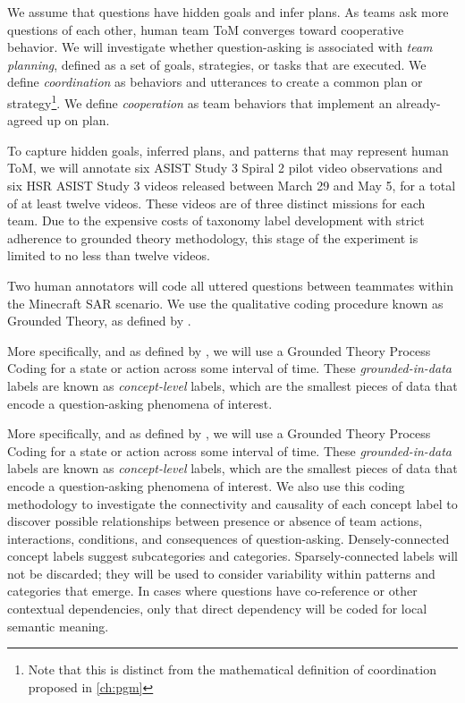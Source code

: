 We assume that questions have hidden goals and infer plans. As teams ask more
questions of each other, human team ToM converges toward cooperative behavior.
We will investigate whether question-asking is associated with \emph{team
planning}, defined as a set of goals, strategies, or tasks that are executed.
We define \emph{coordination} as behaviors and utterances to create a common
plan or strategy\footnote{Note that this is distinct from the mathematical
definition of coordination proposed in \autoref{ch:pgm}}. We define
\emph{cooperation} as team behaviors that implement an already-agreed up on
plan.

To capture hidden goals, inferred plans, and patterns that may represent human
ToM, we will annotate six ASIST Study 3 Spiral 2 pilot video observations and
six HSR ASIST Study 3 videos released between March 29 and May 5, for a total
of at least twelve videos. These videos are of three distinct missions for each
team. Due to the expensive costs of taxonomy label development with strict
adherence to grounded theory methodology, this stage of the experiment is
limited to no less than twelve videos. 

Two human annotators will code all uttered questions between teammates within
the Minecraft SAR scenario.  We use the qualitative coding procedure known as
Grounded Theory, as defined by \citet{corbin_strauss_2015}. 

More specifically, and as defined by \citet{saldana_2021}, we will use a
Grounded Theory Process Coding for a state or action across some interval of
time. These \emph{grounded-in-data} labels are known as \emph{concept-level}
labels, which are the smallest pieces of data that encode a question-asking
phenomena of interest.

More specifically, and as defined by \citet{saldana_2021}, we will use a
Grounded Theory Process Coding for a state or action across some interval of
time. These \emph{grounded-in-data} labels are known as \emph{concept-level}
labels, which are the smallest pieces of data that encode a question-asking
phenomena of interest. We also use this coding methodology to investigate the connectivity and
causality of each concept label to discover possible relationships between
presence or absence of team actions, interactions, conditions, and consequences
of question-asking. Densely-connected concept labels suggest subcategories and
categories. Sparsely-connected labels will not be discarded; they will be used
to consider variability within patterns and categories that emerge. In cases
where questions have co-reference or other contextual dependencies, only that
direct dependency will be coded for local semantic meaning.

